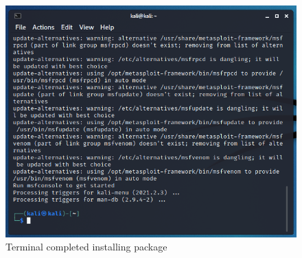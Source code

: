 \documentclass[a4paper, 12pt, titlepage]{report}
\begin{document}
\begin{figure}[H]
    \centering
    \includegraphics[scale=0.5]{pics/meta3.PNG}
    \caption{Terminal completed installing package}
    \label{fig:fig11}
\end{figure}
\end{document}
